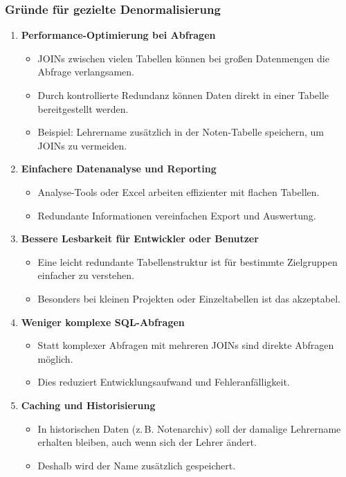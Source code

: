 \documentclass[a4paper,12pt]{article}
\begin{document}
\begin{enumerate}
		\subsubsection*{Gründe für gezielte Denormalisierung}
		
		\begin{enumerate}
			\item \textbf{Performance-Optimierung bei Abfragen}
			\begin{itemize}
				\item JOINs zwischen vielen Tabellen können bei großen Datenmengen die Abfrage verlangsamen.
				\item Durch kontrollierte Redundanz können Daten direkt in einer Tabelle bereitgestellt werden.
				\item Beispiel: Lehrername zusätzlich in der Noten-Tabelle speichern, um JOINs zu vermeiden.
			\end{itemize}
			
			\item \textbf{Einfachere Datenanalyse und Reporting}
			\begin{itemize}
				\item Analyse-Tools oder Excel arbeiten effizienter mit flachen Tabellen.
				\item Redundante Informationen vereinfachen Export und Auswertung.
			\end{itemize}
			
			\item \textbf{Bessere Lesbarkeit für Entwickler oder Benutzer}
			\begin{itemize}
				\item Eine leicht redundante Tabellenstruktur ist für bestimmte Zielgruppen einfacher zu verstehen.
				\item Besonders bei kleinen Projekten oder Einzeltabellen ist das akzeptabel.
			\end{itemize}
			
			\item \textbf{Weniger komplexe SQL-Abfragen}
			\begin{itemize}
				\item Statt komplexer Abfragen mit mehreren JOINs sind direkte Abfragen möglich.
				\item Dies reduziert Entwicklungsaufwand und Fehleranfälligkeit.
			\end{itemize}
			
			\item \textbf{Caching und Historisierung}
			\begin{itemize}
				\item In historischen Daten (z.\,B. Notenarchiv) soll der damalige Lehrername erhalten bleiben, auch wenn sich der Lehrer ändert.
				\item Deshalb wird der Name zusätzlich gespeichert.
			\end{itemize}
		\end{enumerate}
		

\end{enumerate}
\end{document}
